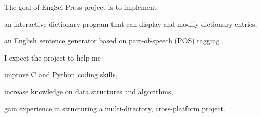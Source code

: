 \documentclass[../main.tex]{subfiles}
\begin{document}
The goal of EngSci Press project is to implement
\begin{enumerate*}[label=(\alph*)]
	\item an interactive dictionary program that can display and modify dictionary entries,
	\item an English sentence generator based on part-of-speech (POS) tagging \cite{bib:part_of_speech_tagging}.
\end{enumerate*}

I expect the project to help me
\begin{enumerate*}[label=(\alph*)]
	\item improve C and Python coding skills,
	\item increase knowledge on data structures and algorithms,
	\item gain experience in structuring a multi-directory, cross-platform project.
\end{enumerate*}
\end{document}
